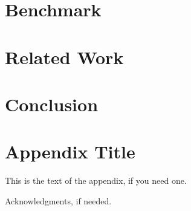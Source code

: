 \documentclass{sigplanconf}
\begin{document}
\section{Benchmark}  

\section{Related Work}

\section{Conclusion}


\appendix
\section{Appendix Title}

This is the text of the appendix, if you need one.

\acks

Acknowledgments, if needed.


\makeatletter
  \def\@seccntformat#1{Appendix~\csname the#1\endcsname:\quad}
\makeatother

    \begin{acronym}[TDMA]
    \end{acronym}



\end{document}
